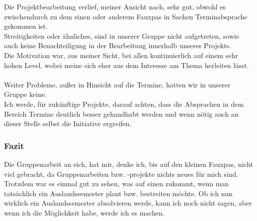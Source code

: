 \documentclass[11pt]{article}
\begin{document}
Die Projektbearbeitung verlief, meiner Ansicht nach, sehr gut, obwohl es zwischendurch zu dem einen oder anderem Fauxpas in Sachen Terminabsprache gekommen ist.\\
Streitigkeiten oder ähnliches, sind in unserer Gruppe nicht aufgetreten, sowie auch keine Benachteiligung in der Bearbeitung innerhalb unseres Projekts.\\
Die Motivation war, aus meiner Sicht, bei allen kontinuierlich auf einem sehr hohen Level, wobei meine sich eher aus dem Interesse am Thema herleiten lässt.
\\\\
Weiter Probleme, außer in Hinsicht auf die Termine, hatten wir in unserer Gruppe keine.\\
Ich werde, für zukünftige Projekte, darauf achten, dass die Absprachen in dem Bereich Termine deutlich besser gehandhabt werden und wenn nötig auch an dieser Stelle selbst die Initiative ergreifen.

\subsubsection{Fazit}

Die Gruppenarbeit an sich, hat mir, denke ich, bis auf den kleinen Fauxpas, nicht viel gebracht, da Gruppenarbeiten bzw. -projekte nichts neues für mich sind.\\
Trotzdem war es einmal gut zu sehen, was auf einen zukommt, wenn man tatsächlich ein Auslandssemester plant bzw. bestreiten möchte.
Ob ich nun wirklich ein Auslandssemester absolvieren werde, kann ich noch nicht sagen, aber wenn ich die Möglichkeit habe, werde ich es machen.

\newpage
\end{document}
